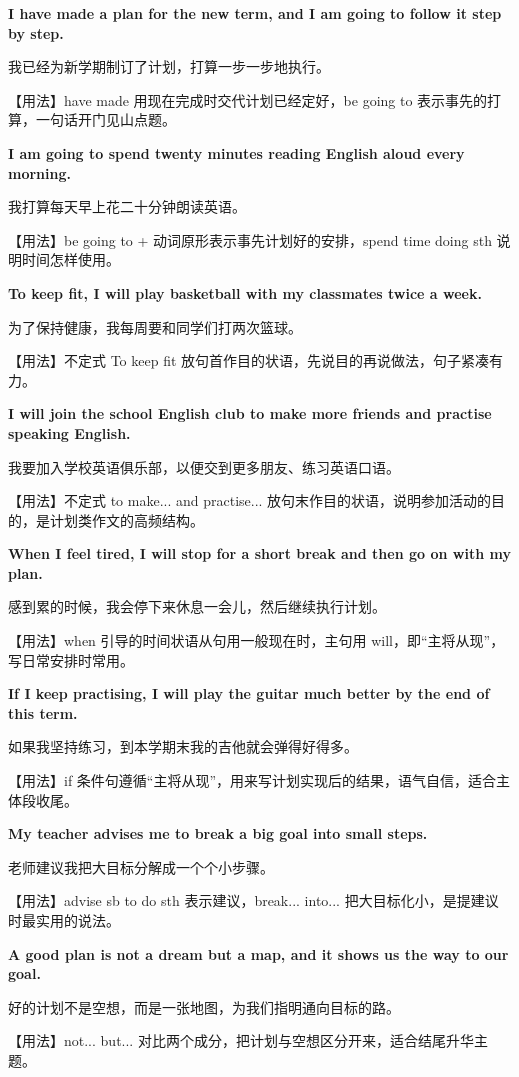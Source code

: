 \documentclass[UTF8,a4paper,11pt,oneside]{ctexbook}
\newcommand{\fansection}[1]{%
  \par\addvspace{2.4ex}%
  \Needspace{6\baselineskip}%
  \noindent{\sffamily\Large\bfseries\color{mainblue}#1}\par
  \nopagebreak
  \addvspace{0.2ex}%
  \noindent{\color{rulelight}\rule{\linewidth}{0.9pt}}\par
  \addvspace{0.9ex}%
  \nobreak
}
\newcommand{\fanpat}[3]{%
  \item{\bfseries #1}\par\nopagebreak
  {\small\color{textgray}#2}\par\nopagebreak
  {\footnotesize\color{accent!90!black}【用法】#3}\par
}
\begin{document}
\fansection{〇、本单元写作常用句型}
\begin{fanpatterns}
\fanpat{I have made a plan for the new term, and I am going to follow it step by step.}{我已经为新学期制订了计划，打算一步一步地执行。}{have made 用现在完成时交代计划已经定好，be going to 表示事先的打算，一句话开门见山点题。}

\fanpat{I am going to spend twenty minutes reading English aloud every morning.}{我打算每天早上花二十分钟朗读英语。}{be going to + 动词原形表示事先计划好的安排，spend time doing sth 说明时间怎样使用。}

\fanpat{To keep fit, I will play basketball with my classmates twice a week.}{为了保持健康，我每周要和同学们打两次篮球。}{不定式 To keep fit 放句首作目的状语，先说目的再说做法，句子紧凑有力。}

\fanpat{I will join the school English club to make more friends and practise speaking English.}{我要加入学校英语俱乐部，以便交到更多朋友、练习英语口语。}{不定式 to make... and practise... 放句末作目的状语，说明参加活动的目的，是计划类作文的高频结构。}

\fanpat{When I feel tired, I will stop for a short break and then go on with my plan.}{感到累的时候，我会停下来休息一会儿，然后继续执行计划。}{when 引导的时间状语从句用一般现在时，主句用 will，即“主将从现”，写日常安排时常用。}

\fanpat{If I keep practising, I will play the guitar much better by the end of this term.}{如果我坚持练习，到本学期末我的吉他就会弹得好得多。}{if 条件句遵循“主将从现”，用来写计划实现后的结果，语气自信，适合主体段收尾。}

\fanpat{My teacher advises me to break a big goal into small steps.}{老师建议我把大目标分解成一个个小步骤。}{advise sb to do sth 表示建议，break... into... 把大目标化小，是提建议时最实用的说法。}

\fanpat{A good plan is not a dream but a map, and it shows us the way to our goal.}{好的计划不是空想，而是一张地图，为我们指明通向目标的路。}{not... but... 对比两个成分，把计划与空想区分开来，适合结尾升华主题。}

\end{fanpatterns}

\fansection{一、满分范文}
\end{document}
